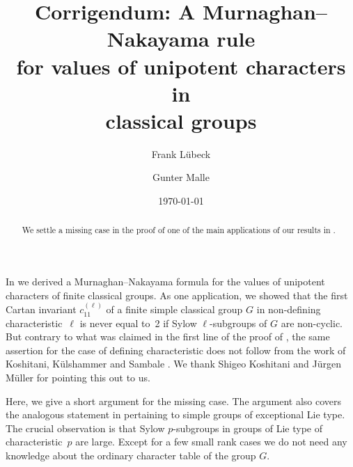 \documentclass{ert-l}
\theoremstyle{remark}
\begin{document}
\title[Corrigendum: Murnaghan--Nakayama rule]
      {Corrigendum: A Murnaghan--Nakayama rule\\ for values of unipotent
       characters in\\ classical groups}

\date{\today}


\author{Frank L\"ubeck}
\address{Lehrstuhl D f\"ur Mathematik, RWTH Aachen, Pontdriesch 14/16,
  52062 Aachen, Germany.}

\author{Gunter Malle }
\address{FB Mathematik, TU Kaiserslautern, Postfach 3049,
         67653 Kaisers\-lautern, Germany.}




\begin{abstract}
We settle a missing case in the proof of one of the main applications of
our results in \cite{LM16}.
\end{abstract}

\maketitle

In \cite{LM16} we derived a Murnaghan--Nakayama formula for the values of
unipotent characters of finite classical groups. As one application, we showed
that the first Cartan invariant $c_{11}^{(\ell)}$ of a finite simple classical
group $G$ in non-defining characteristic~$\ell$ is never equal to~2 if Sylow
$\ell$-subgroups of $G$ are
non-cyclic. But contrary to what was claimed in the first line of the proof
of \cite[Thm.~7.1]{LM16}, the same assertion for the case of defining
characteristic does not follow from the work of Koshitani, K\"ulshammer and
Sambale \cite{KKS}. We thank Shigeo Koshitani and J\"urgen M\"uller for
pointing this out to us.

Here, we give a short argument for the missing case. The argument also
covers the
analogous statement in \cite[Prop.~6.3]{LM15} pertaining to simple groups of
exceptional Lie type. The crucial observation is that Sylow $p$-subgroups in
groups of Lie type of characteristic~$p$ are large. Except for a few small
rank cases we do not need any knowledge about the ordinary character table of
the group $G$. 
\end{document}
